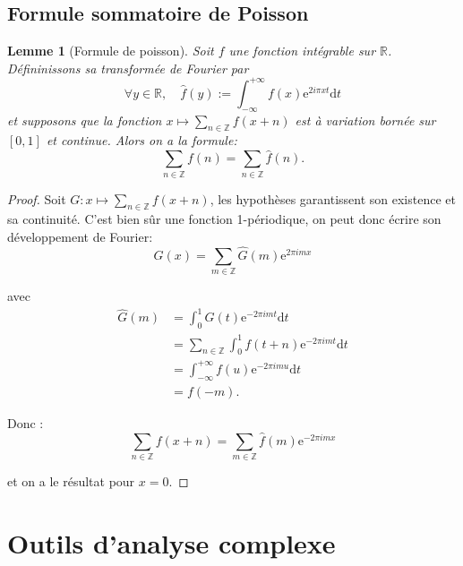 \documentclass[french]{report}
\newtheorem{lemma}[theorem]{Lemme}
\begin{document}
\subsection{Formule sommatoire de Poisson}

\begin{lemma}[Formule de poisson]\label{lem:formule-poisson}
  Soit $f$ une fonction intégrable sur $\mathbb{R}$. Défininissons sa transformée de Fourier par
  \[
    \forall y\in\mathbb{R},\quad\hat{f}(y):=\int_{-\infty}^{+\infty}f(x)\mathrm{e}^{2i\pi xt}\mathrm{d}t
  \]
  et supposons que la fonction $x\mapsto\sum_{n\in\mathbb{Z}}f(x+n)$ est à variation bornée sur $[0,1]$ et continue. Alors on a la formule:
  \[
    \sum_{n\in\mathbb{Z}}f(n)=\sum_{n\in\mathbb{Z}}\hat{f}(n).
  \]
\end{lemma}

\begin{proof}
  Soit $G:x\mapsto\sum_{n\in\mathbb{Z}}f(x+n)$, les hypothèses garantissent son existence et sa continuité. C'est bien sûr une fonction 1-périodique, on peut donc écrire son développement de Fourier:
  \[
    G(x)
    =\sum_{m\in\mathbb{Z}}\hat{G}(m)\mathrm{e}^{2\pi imx}
  \]

  avec
  \begin{align*}
    \hat{G}(m)
    &= \int_0^1 G(t)\mathrm{e}^{-2\pi imt}\mathrm{d}t \\
    &= \sum_{n\in\mathbb{Z}}\int_0^1 f(t+n)\mathrm{e}^{-2\pi imt}\mathrm{d}t \\
    &= \int_{-\infty}^{+\infty} f(u)\mathrm{e}^{-2\pi imu}\mathrm{d}t \\
    &= f(-m).
  \end{align*}

  Donc :
  \[
    \sum_{n\in\mathbb{Z}}f(x+n) = \sum_{m\in\mathbb{Z}}\hat{f}(m)\mathrm{e}^{-2\pi imx}
  \]

  et on a le résultat pour $x=0$.
\end{proof}

\section{Outils d'analyse complexe}
\end{document}
